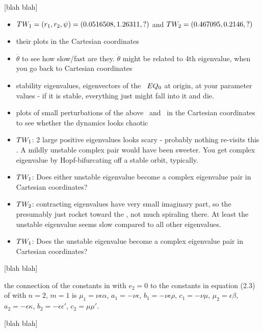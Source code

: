\documentclass[aip,cha,reprint,
secnumarabic,
nofootinbib, tightenlines,
nobibnotes, showkeys, showpacs,
groupedaddress
]{revtex4-1}
\begin{document}
 [blah blah]

\begin{itemize}
  \item $TW_{1} = (r_1,r_2,\psi)=(0.0516508, 1.26311,?)$ and
        $TW_{2} = (0.467095,0.2146,?)$
  \item their plots in the Cartesian coordinates
  \item $\dot{\theta}$ to see how slow/fast are they. $\dot{\theta}$
        might be related to 4th eigenvalue, when you go back
        to Cartesian coordinates
  \item stability eigenvalues, eigenvectors of the \eqv\ $EQ_{0}$ at
        origin, at your parameter values - if it is stable, everything
        just might fall into it and die.
  \item plots of small perturbations of the above \eqv\ and \reqva\ in
        the Cartesian coordinates to see whether the dynamics looks
        chaotic
  \item $TW_{1}$: 2 large positive eigenvalues looks scary - probably
        nothing re-visits this \reqv. A mildly unstable complex pair
        would have been sweeter. You get complex eigenvalue by Hopf-bifurcating off a
        stable orbit, typically.
  \item $TW_{1}$: Does either unstable eigenvalue become a complex
        eigenvalue pair in Cartesian coordinates?
  \item $TW_{2}$: contracting eigenvalues have very small imaginary
        part, so the presumably just rocket toward the \reqv, not much
        spiraling there. At least the unstable eigenvalue seems slow
        compared to all other eigenvalues.
  \item $TW_{1}$: Does the unstable eigenvalue become a complex
        eigenvalue pair in Cartesian coordinates?
\end{itemize}

 [blah blah]

the connection
of the constants in  with $e_2=0$ to the constants in
equation (2.3) of  with $n=2$, $m=1$ is $\mu_1=\nu\epsilon\alpha$,
$a_1=-\nu\epsilon$, $b_1=-\nu\epsilon\rho$, $c_1=-\nu\mu$, $\mu_2=\epsilon\beta$,
$a_2=-\epsilon\kappa$, $b_2=-\epsilon\epsilon'$, $c_2=\mu\mu'$.


 [blah blah]
\end{document}
